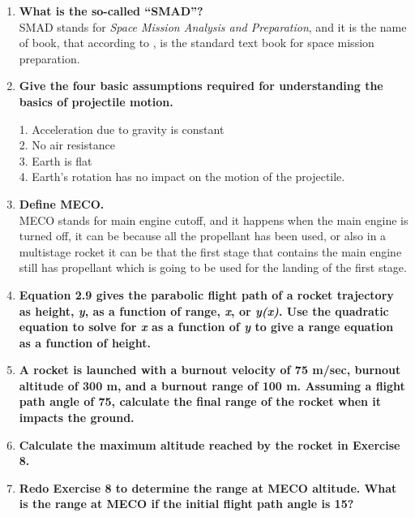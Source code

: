 \documentclass{article}
\begin{document}
\begin{enumerate}
	\item {\bf What is the so-called “SMAD”?}\\
	
SMAD stands for \textit{Space Mission Analysis and Preparation}, and it is the name of book, that according to \cite{book}, is the standard text book for space mission preparation.
	
	\item {\bf Give the four basic assumptions required for understanding the basics of projectile motion.}\\
	
\begin{enumerate}
1. Acceleration due to gravity is constant\\
2. No air resistance\\
3. Earth is flat\\
4. Earth’s rotation has no impact on the motion of the projectile.
\end{enumerate}
	
	\item {\bf Define MECO.}\\
	
MECO stands for main engine cutoff, and it happens when the main engine is turned off, it can be because all the propellant has been used, or also in a multistage rocket it can be that the first stage that contains the main engine still has propellant which is going to be used for the landing of the first stage.
	
	\item {\bf Equation 2.9 gives the parabolic flight path of a rocket trajectory as height, \textit{y}, as a function of range, \textit{x}, or \textit{y(x)}. Use the quadratic equation to solve for \textit{x} as a function of \textit{y} to give a range equation as a function of height.}\\
	
	\item {\bf A rocket is launched with a burnout velocity of 75 m/sec, burnout altitude of 300 m, and a burnout range of 100 m. Assuming a flight path angle of 75\degree, calculate the final range of the rocket when it impacts the ground.}\\
	
	\item {\bf Calculate the maximum altitude reached by the rocket in Exercise 8.}\\

	\item {\bf Redo Exercise 8 to determine the range at MECO altitude. What is the range at MECO if the initial flight path angle is 15\degree ?}\\
	
\end{enumerate}
\end{document}
